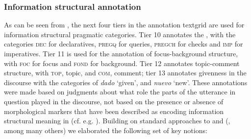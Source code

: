 \documentclass[output=paper]{LSP/langsci}
\begin{document}
\subsubsection{Information structural annotation}
\label{sec:buc:3.3.2}
As can be seen from , the next four tiers in the annotation textgrid are used for information structural pragmatic categories. %
Tier 10 annotates the , with the categories \textsc{dec} for declaratives, \textsc{pregq} for queries, 
\textsc{pregch} for checks and \textsc{imp} for imperatives. 
Tier 11 is used for the annotation of focus-background structure, with \textsc{foc} for focus and \textsc{fond} for background. 
Tier 12 annotates topic-comment structure, with \textsc{top}, topic, and \textsc{com}, comment; 
tier 13 annotates givenness in the discourse with the categories of \textit{dado} `given', and \textit{nuevo} `new'. These annotations were made based on judgments about what role the parts of the utterance in question played in the discourse, not based on the presence or absence of morphological markers that have been described as encoding information structural meaning in  (cf. e.g. \citealt{Woelck1972,Weber1986,Muysken1995,GomezRendon2006}). Building on standard approaches to  and  (\citealt{Austin1962,Searle1969,Chafe1976,Bolinger1989,Rooth1992,Grice1997,Baumann2006,Krifka2007}, among many others) we elaborated the following set of key notions:  
\end{document}
